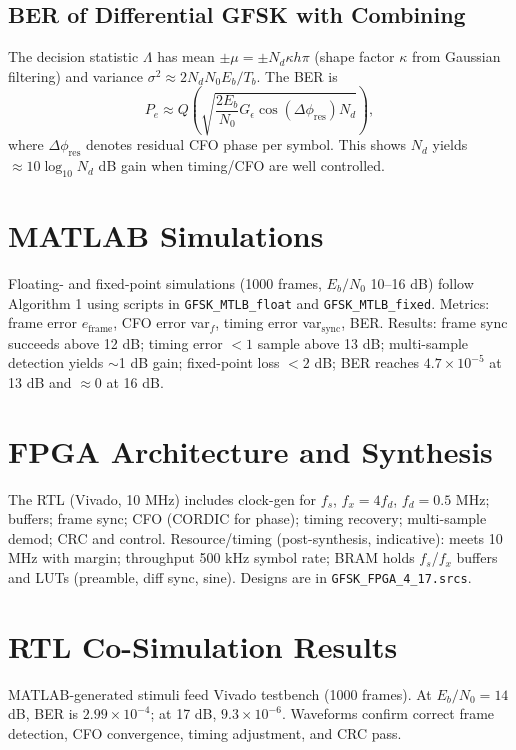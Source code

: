 \documentclass[journal]{IEEEtran}
\begin{document}
\subsection{BER of Differential GFSK with Combining}
The decision statistic $\Lambda$ has mean $\pm \mu = \pm N_d \kappa h \pi$ (shape factor $\kappa$ from Gaussian filtering) and variance $\sigma^2 \approx 2N_d N_0 E_b/T_b$. The BER is
\begin{equation}
P_e \approx Q\!\left(\sqrt{\frac{2 E_b}{N_0} G_{\epsilon} \cos(\Delta\phi_{\text{res}}) N_d}\right),
\end{equation}
where $\Delta\phi_{\text{res}}$ denotes residual CFO phase per symbol. This shows $N_d$ yields $\approx10\log_{10} N_d$ dB gain when timing/CFO are well controlled.

\section{MATLAB Simulations}
Floating- and fixed-point simulations (1000 frames, $E_b/N_0$ 10--16 dB) follow Algorithm 1 using scripts in \texttt{GFSK\_MTLB\_float} and \texttt{GFSK\_MTLB\_fixed}. Metrics: frame error $e_{\text{frame}}$, CFO error var$_f$, timing error var$_{\text{sync}}$, BER. Results: frame sync succeeds above 12 dB; timing error $<1$ sample above 13 dB; multi-sample detection yields $\sim$1 dB gain; fixed-point loss $<2$ dB; BER reaches $4.7\times10^{-5}$ at 13 dB and $\approx0$ at 16 dB.

\section{FPGA Architecture and Synthesis}
The RTL (Vivado, 10 MHz) includes clock-gen for $f_s$, $f_x=4f_d$, $f_d=0.5$ MHz; buffers; frame sync; CFO (CORDIC for phase); timing recovery; multi-sample demod; CRC and control. Resource/timing (post-synthesis, indicative): meets 10 MHz with margin; throughput 500 kHz symbol rate; BRAM holds $f_s$/$f_x$ buffers and LUTs (preamble, diff sync, sine). Designs are in \texttt{GFSK\_FPGA\_4\_17.srcs}.

\section{RTL Co-Simulation Results}
MATLAB-generated stimuli feed Vivado testbench (1000 frames). At $E_b/N_0=14$ dB, BER is $2.99\times10^{-4}$; at 17 dB, $9.3\times10^{-6}$. Waveforms confirm correct frame detection, CFO convergence, timing adjustment, and CRC pass.
\end{document}
